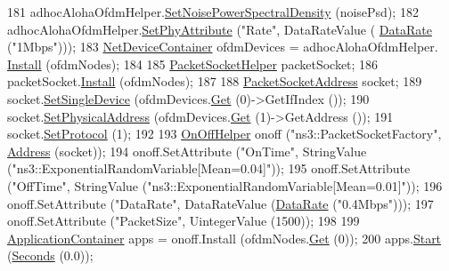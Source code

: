 \begin{DoxyCode}
181   adhocAlohaOfdmHelper.\hyperlink{classns3_1_1AdhocAlohaNoackIdealPhyHelper_a6a5f5df28a9bddbe04e8e4815bdce244}{SetNoisePowerSpectralDensity} (noisePsd);
182   adhocAlohaOfdmHelper.\hyperlink{classns3_1_1AdhocAlohaNoackIdealPhyHelper_a073f6728abd6e3880475b29cbc415792}{SetPhyAttribute} (\textcolor{stringliteral}{"Rate"}, DataRateValue (
      \hyperlink{classns3_1_1DataRate}{DataRate} (\textcolor{stringliteral}{"1Mbps"})));
183   \hyperlink{classns3_1_1NetDeviceContainer}{NetDeviceContainer} ofdmDevices = adhocAlohaOfdmHelper.
      \hyperlink{classns3_1_1AdhocAlohaNoackIdealPhyHelper_a0b9cb9d602fd1027f7f39a776e745abe}{Install} (ofdmNodes);
184 
185   \hyperlink{classns3_1_1PacketSocketHelper}{PacketSocketHelper} packetSocket;
186   packetSocket.\hyperlink{classns3_1_1PacketSocketHelper_a33f449fee7fd10411949d17feba6d33e}{Install} (ofdmNodes);
187 
188   \hyperlink{classns3_1_1PacketSocketAddress}{PacketSocketAddress} socket;
189   socket.\hyperlink{classns3_1_1PacketSocketAddress_ad1caa016f4d27c9d5f2c06dbfc53f8a3}{SetSingleDevice} (ofdmDevices.\hyperlink{classns3_1_1NetDeviceContainer_a677d62594b5c9d2dea155cc5045f4d0b}{Get} (0)->GetIfIndex ());
190   socket.\hyperlink{classns3_1_1PacketSocketAddress_a9452f9410a97e57344e464e25c2ab0f3}{SetPhysicalAddress} (ofdmDevices.\hyperlink{classns3_1_1NetDeviceContainer_a677d62594b5c9d2dea155cc5045f4d0b}{Get} (1)->GetAddress ());
191   socket.\hyperlink{classns3_1_1PacketSocketAddress_a9020962e39c238277f3b2f0de605647a}{SetProtocol} (1);
192 
193   \hyperlink{classns3_1_1OnOffHelper}{OnOffHelper} onoff (\textcolor{stringliteral}{"ns3::PacketSocketFactory"}, \hyperlink{classns3_1_1Address}{Address} (socket));
194   onoff.SetAttribute (\textcolor{stringliteral}{"OnTime"}, StringValue (\textcolor{stringliteral}{"ns3::ExponentialRandomVariable[Mean=0.04]"}));
195   onoff.SetAttribute (\textcolor{stringliteral}{"OffTime"}, StringValue (\textcolor{stringliteral}{"ns3::ExponentialRandomVariable[Mean=0.01]"}));
196   onoff.SetAttribute (\textcolor{stringliteral}{"DataRate"}, DataRateValue (\hyperlink{classns3_1_1DataRate}{DataRate} (\textcolor{stringliteral}{"0.4Mbps"})));
197   onoff.SetAttribute (\textcolor{stringliteral}{"PacketSize"}, UintegerValue (1500));
198 
199   \hyperlink{classns3_1_1ApplicationContainer}{ApplicationContainer} apps = onoff.Install (ofdmNodes.\hyperlink{classns3_1_1NodeContainer_a9ed96e2ecc22e0f5a3d4842eb9bf90bf}{Get} (0));
200   apps.\hyperlink{classns3_1_1ApplicationContainer_a8eff87926507020bbe3e1390358a54a7}{Start} (\hyperlink{group__timecivil_ga33c34b816f8ff6628e33d5c8e9713b9e}{Seconds} (0.0));

\end{DoxyCode}
